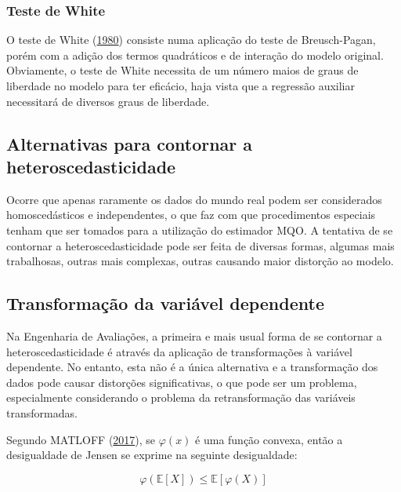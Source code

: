 \documentclass[a4paper, 12pt]{article}
\begin{document}
\hypertarget{teste-de-white}{%
\subsubsection{Teste de White}\label{teste-de-white}}

O teste de White (\protect\hyperlink{ref-white1980}{1980}) consiste numa
aplicação do teste de Breusch-Pagan, porém com a adição dos termos
quadráticos e de interação do modelo original. Obviamente, o teste de
White necessita de um número maios de graus de liberdade no modelo para
ter eficácio, haja vista que a regressão auxiliar necessitará de
diversos graus de liberdade.

\hypertarget{alternativas-para-contornar-a-heteroscedasticidade}{%
\subsection{Alternativas para contornar a
heteroscedasticidade}\label{alternativas-para-contornar-a-heteroscedasticidade}}

Ocorre que apenas raramente os dados do mundo real podem ser
considerados homoscedásticos e independentes, o que faz com que
procedimentos especiais tenham que ser tomados para a utilização do
estimador MQO. A tentativa de se contornar a heteroscedasticidade pode
ser feita de diversas formas, algumas mais trabalhosas, outras mais
complexas, outras causando maior distorção ao modelo.

\hypertarget{transformacao-da-variavel-dependente}{%
\subsection{Transformação da variável
dependente}\label{transformacao-da-variavel-dependente}}

Na Engenharia de Avaliações, a primeira e mais usual forma de se
contornar a heteroscedasticidade é através da aplicação de
transformações à variável dependente. No entanto, esta não é a única
alternativa e a transformação dos dados pode causar distorções
significativas, o que pode ser um problema, especialmente considerando o
problema da retransformação das variáveis transformadas.

Segundo MATLOFF (\protect\hyperlink{ref-matloff2017}{2017}), se
\(\varphi(x)\) é uma função convexa, então a desigualdade de Jensen se
exprime na seguinte desigualdade:

\[\varphi \left(\mathbb{E} [X]\right)\leq \mathbb{E} \left[\varphi (X)\right]\]
\end{document}

